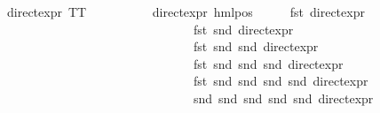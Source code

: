 \begin{isabellebody}
\ \ {\isachardoublequoteopen}direct{\isacharunderscore}{\kern0pt}expr\ TT\ {\isacharequal}{\kern0pt}\ {\isacharparenleft}{\kern0pt}{}{\isacharcomma}{\kern0pt}\ {}{\isacharcomma}{\kern0pt}\ {}{\isacharcomma}{\kern0pt}\ {}{\isacharcomma}{\kern0pt}\ {}{\isacharcomma}{\kern0pt}\ {}{\isacharparenright}{\kern0pt}{\isachardoublequoteclose}\ {\isacharbar}{\kern0pt}\isanewline
\ \ {\isachardoublequoteopen}direct{\isacharunderscore}{\kern0pt}expr\ {\isacharparenleft}{\kern0pt}hml{\isacharunderscore}{\kern0pt}pos\ {\isasymalpha}\ {\isasymphi}{\isacharparenright}{\kern0pt}\ {\isacharequal}{\kern0pt}\ {\isacharparenleft}{\kern0pt}{}\ {\isacharplus}{\kern0pt}\ fst\ {\isacharparenleft}{\kern0pt}direct{\isacharunderscore}{\kern0pt}expr\ {\isasymphi}{\isacharparenright}{\kern0pt}{\isacharcomma}{\kern0pt}\ \isanewline
\ \ \ \ \ \ \ \ \ \ \ \ \ \ \ \ \ \ \ \ \ \ \ \ \ \ \ \ \ \ \ \ fst\ {\isacharparenleft}{\kern0pt}snd\ {\isacharparenleft}{\kern0pt}direct{\isacharunderscore}{\kern0pt}expr\ {\isasymphi}{\isacharparenright}{\kern0pt}{\isacharparenright}{\kern0pt}{\isacharcomma}{\kern0pt}\ \isanewline
\ \ \ \ \ \ \ \ \ \ \ \ \ \ \ \ \ \ \ \ \ \ \ \ \ \ \ \ \ \ \ \ fst\ {\isacharparenleft}{\kern0pt}snd\ {\isacharparenleft}{\kern0pt}snd\ {\isacharparenleft}{\kern0pt}direct{\isacharunderscore}{\kern0pt}expr\ {\isasymphi}{\isacharparenright}{\kern0pt}{\isacharparenright}{\kern0pt}{\isacharparenright}{\kern0pt}{\isacharcomma}{\kern0pt}\ \isanewline
\ \ \ \ \ \ \ \ \ \ \ \ \ \ \ \ \ \ \ \ \ \ \ \ \ \ \ \ \ \ \ \ fst\ {\isacharparenleft}{\kern0pt}snd\ {\isacharparenleft}{\kern0pt}snd\ {\isacharparenleft}{\kern0pt}snd\ {\isacharparenleft}{\kern0pt}direct{\isacharunderscore}{\kern0pt}expr\ {\isasymphi}{\isacharparenright}{\kern0pt}{\isacharparenright}{\kern0pt}{\isacharparenright}{\kern0pt}{\isacharparenright}{\kern0pt}{\isacharcomma}{\kern0pt}\ \isanewline
\ \ \ \ \ \ \ \ \ \ \ \ \ \ \ \ \ \ \ \ \ \ \ \ \ \ \ \ \ \ \ \ fst\ {\isacharparenleft}{\kern0pt}snd\ {\isacharparenleft}{\kern0pt}snd\ {\isacharparenleft}{\kern0pt}snd\ {\isacharparenleft}{\kern0pt}snd\ {\isacharparenleft}{\kern0pt}direct{\isacharunderscore}{\kern0pt}expr\ {\isasymphi}{\isacharparenright}{\kern0pt}{\isacharparenright}{\kern0pt}{\isacharparenright}{\kern0pt}{\isacharparenright}{\kern0pt}{\isacharparenright}{\kern0pt}{\isacharcomma}{\kern0pt}\ \isanewline
\ \ \ \ \ \ \ \ \ \ \ \ \ \ \ \ \ \ \ \ \ \ \ \ \ \ \ \ \ \ \ \ snd\ {\isacharparenleft}{\kern0pt}snd\ {\isacharparenleft}{\kern0pt}snd\ {\isacharparenleft}{\kern0pt}snd\ {\isacharparenleft}{\kern0pt}snd\ {\isacharparenleft}{\kern0pt}direct{\isacharunderscore}{\kern0pt}expr\ {\isasymphi}{\isacharparenright}{\kern0pt}{\isacharparenright}{\kern0pt}{\isacharparenright}{\kern0pt}{\isacharparenright}{\kern0pt}{\isacharparenright}{\kern0pt}{\isacharparenright}{\kern0pt}{\isachardoublequoteclose}\ {\isacharbar}{\kern0pt}\isanewline

\end{isabellebody}
